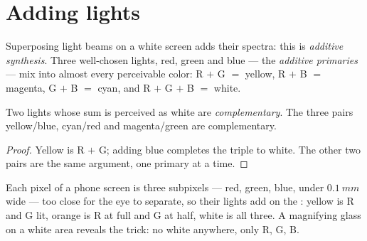 \section{Adding lights}

\begin{definition}\label{def:g11:color-light-sources:additive}
Superposing light beams on a white screen adds their spectra: this is
\emph{additive synthesis}. Three well-chosen
lights, red, green and blue --- the \emph{additive
primaries} --- mix into almost every perceivable
color: R $+$ G $=$ yellow, R $+$ B $=$ magenta, G $+$ B $=$ cyan, and
R $+$ G $+$ B $=$ white.
\end{definition}

\begin{proposition}\label{prop:g11:color-light-sources:complementary}
Two lights whose sum is perceived as white are
\emph{complementary}. The three pairs
yellow/blue, cyan/red and magenta/green are complementary.
\end{proposition}

\begin{proof}
Yellow is R $+$ G; adding blue completes the triple to white. The other
two pairs are the same argument, one primary at a time.
\end{proof}

\begin{example}[Screens]\label{ex:g11:color-light-sources:screen}
Each pixel of a phone screen is three subpixels --- red, green, blue,
under $\qty{0.1}{mm}$ wide --- too close for the eye to separate, so
their lights add on the : yellow is R and G lit, orange is R at
full  and G at half, white is all three. A magnifying glass on a
white area reveals the trick: no white anywhere, only R, G, B.
\end{example}

